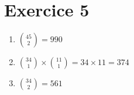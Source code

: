 \part{Exercice 5}

\begin{enumerate}
	\item ${45\choose 2} = 990$
	\item  ${34 \choose 1} \times {11 \choose 1} = 34 \times 11 = 374$ 
	\item ${34 \choose 2} = 561$
\end{enumerate}
